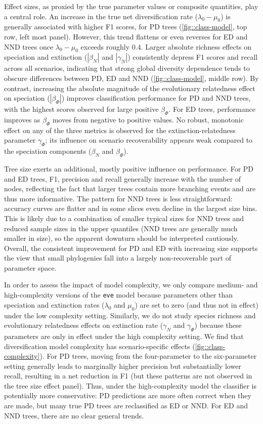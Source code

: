 {Effect sizes, as proxied by the true parameter values or composite quantities, play a central role. An increase in the true net diversification rate (\(\lambda_0 - \mu_0\)) is generally associated with higher F1 scores, for PD trees (\autoref{fig::class-model}, top row, left most panel). However, this trend flattens or even reverses for ED and NND trees once \(\lambda_0 - \mu_0\) exceeds roughly 0.4. Larger absolute richness effects on speciation and extinction (\(|\beta_N|\) and \(|\gamma_N|\)) consistently depress F1 scores and recall across all scenarios, indicating that strong global diversity dependence tends to obscure differences between PD, ED and NND (\autoref{fig::class-model}, middle row). By contrast, increasing the absolute magnitude of the evolutionary relatedness effect on speciation (\(|\beta_{\varPhi}|\)) improves classification performance for PD and NND trees, with the highest scores observed for large positive \(\beta_{\varPhi}\). For ED trees, performance improves as \(\beta_{\varPhi}\) moves from negative to positive values. No robust, monotonic effect on any of the three metrics is observed for the extinction-relatedness parameter \(\gamma_{\varPhi}\); its influence on scenario recoverability appears weak compared to the speciation components ($\beta_N$ and $\beta_\varPhi$).

Tree size exerts an additional, mostly positive influence on performance. For PD and ED trees, F1, precision and recall generally increase with the number of nodes, reflecting the fact that larger trees contain more branching events and are thus more informative. The pattern for NND trees is less straightforward: accuracy curves are flatter and in some slices even decline in the largest size bins. This is likely due to a combination of smaller typical sizes for NND trees and reduced sample sizes in the upper quantiles (NND trees are generally much smaller in size), so the apparent downturn should be interpreted cautiously. Overall, the consistent improvement for PD and ED with increasing size supports the view that small phylogenies fall into a largely non-recoverable part of parameter space.

In order to assess the impact of model complexity, we only compare medium- and high-complexity versions of the \texttt{eve} model because parameters other than speciation and extinction rates ($\lambda_0$ and $\mu_0$) are set to zero (and thus not in effect) under the low complexity setting. Similarly, we do not study species richness and evolutionary relatedness effects on extinction rate ($\gamma_N$ and $\gamma_\varPhi$) because these parameters are only in effect under the high complexity setting. We find that diversification model complexity has scenario-specific effects (\autoref{fig::class-complexity}). For PD trees, moving from the four-parameter to the six-parameter setting generally leads to marginally higher precision but substantially lower recall, resulting in a net reduction in F1 (but these patterns are not observed in the tree size effect panel). Thus, under the high-complexity model the classifier is potentially more conservative: PD predictions are more often correct when they are made, but many true PD trees are reclassified as ED or NND. For ED and NND trees, there are no clear general trends.

}
